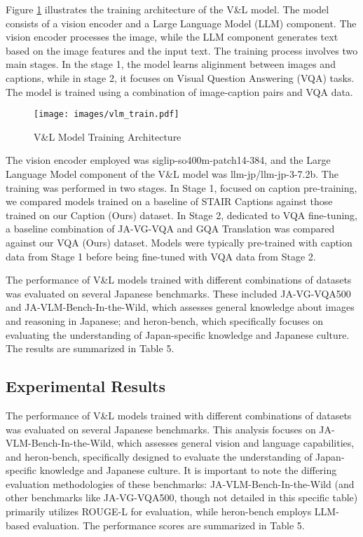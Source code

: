 \documentclass[11pt]{article}
\begin{document}
Figure \ref{fig:vl_train} illustrates the training architecture of the V\&L model. The model consists of a vision encoder and a Large Language Model (LLM) component. The vision encoder processes the image, while the LLM component generates text based on the image features and the input text.
The training process involves two main stages. In the stage 1, the model learns aliginment between images and captions, while in stage 2, it focuses on Visual Question Answering (VQA) tasks. The model is trained using a combination of image-caption pairs and VQA data.

\begin{figure}[t]
  \centering
  \texttt{[image: images/vlm\_train.pdf]}
  \caption{V\&L Model Training Architecture}
  \label{fig:vl_train}
\end{figure}

The vision encoder employed was siglip-so400m-patch14-384, and the Large Language Model component of the V\&L model was llm-jp/llm-jp-3-7.2b. The training was performed in two stages. In Stage 1, focused on caption pre-training, we compared models trained on a baseline of STAIR Captions against those trained on our Caption (Ours) dataset. In Stage 2, dedicated to VQA fine-tuning, a baseline combination of JA-VG-VQA and GQA Translation was compared against our VQA (Ours) dataset. Models were typically pre-trained with caption data from Stage 1 before being fine-tuned with VQA data from Stage 2.

The performance of V\&L models trained with different combinations of datasets was evaluated on several Japanese benchmarks. These included JA-VG-VQA500 and JA-VLM-Bench-In-the-Wild, which assesses general knowledge about images and reasoning in Japanese; and heron-bench, which specifically focuses on evaluating the understanding of Japan-specific knowledge and Japanese culture. The results are summarized in Table 5.

\subsection{Experimental Results}

The performance of V\&L models trained with different combinations of datasets was evaluated on several Japanese benchmarks. This analysis focuses on JA-VLM-Bench-In-the-Wild, which assesses general vision and language capabilities, and heron-bench, specifically designed to evaluate the understanding of Japan-specific knowledge and Japanese culture. It is important to note the differing evaluation methodologies of these benchmarks: JA-VLM-Bench-In-the-Wild (and other benchmarks like JA-VG-VQA500, though not detailed in this specific table) primarily utilizes ROUGE-L for evaluation, while heron-bench employs LLM-based evaluation. The performance scores are summarized in Table 5.
\end{document}
